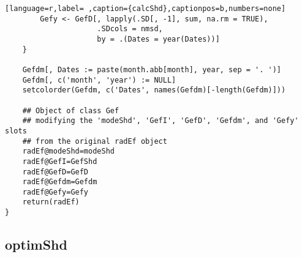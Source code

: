 \begin{lstlisting}[language=r,label= ,caption={calcShd},captionpos=b,numbers=none]
        Gefy <- GefD[, lapply(.SD[, -1], sum, na.rm = TRUE),
                     .SDcols = nmsd,
                     by = .(Dates = year(Dates))]
    }

    Gefdm[, Dates := paste(month.abb[month], year, sep = '. ')]
    Gefdm[, c('month', 'year') := NULL]
    setcolorder(Gefdm, c('Dates', names(Gefdm)[-length(Gefdm)]))

    ## Object of class Gef
    ## modifying the 'modeShd', 'GefI', 'GefD', 'Gefdm', and 'Gefy' slots
    ## from the original radEf object
    radEf@modeShd=modeShd
    radEf@GefI=GefShd
    radEf@GefD=GefD
    radEf@Gefdm=Gefdm
    radEf@Gefy=Gefy
    return(radEf)
}
\end{lstlisting}
\subsection{optimShd}
\label{sec:orgad1062f}
\label{subsec:optimShd}
